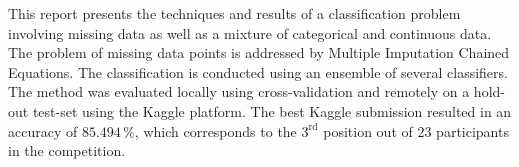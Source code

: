This report presents the techniques and results of a classification
  problem involving missing data as well as a mixture of categorical
  and continuous data. The problem of missing data points is
  addressed by Multiple Imputation Chained Equations. The
  classification is conducted using an ensemble of several classifiers. The
  method was evaluated locally using cross-validation and
  remotely on a hold-out test-set using the Kaggle platform. The best
  Kaggle submission resulted in an accuracy of $85.494\,\%$, which corresponds to
the $3^{\text{rd}}$ position out of $23$ participants in the competition.